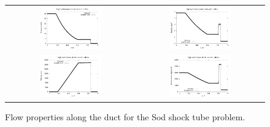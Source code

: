 \begin{figure}[htbp]
\begin{tabular}{cc}
\includegraphics[width=0.5\textwidth]{../2D/classic-shock-tube/cst-p.pdf} &
\includegraphics[width=0.5\textwidth]{../2D/classic-shock-tube/cst-rho.pdf}\\
\includegraphics[width=0.5\textwidth]{../2D/classic-shock-tube/cst-u.pdf} &
\includegraphics[width=0.5\textwidth]{../2D/classic-shock-tube/cst-T.pdf}
\end{tabular}
\caption{Flow properties along the duct for the Sod shock tube problem.}
\label{cst-profiles-fig}
\end{figure}

